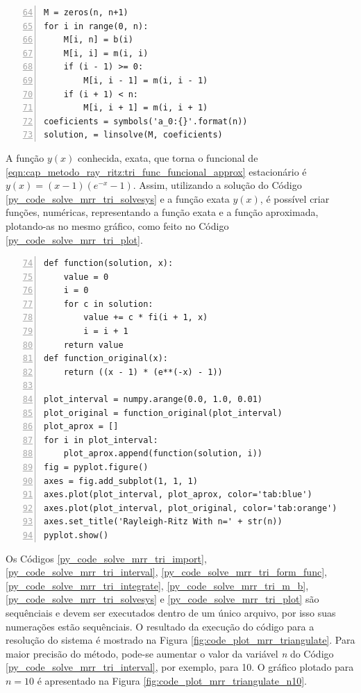 \documentclass[
	12pt,				%
	openright,			%
    twoside,			%
	a4paper,			%
	english,			%
	french,				%
	spanish,			%
	brazil				%
	]{abntex2}
\numberwithin{lema}{chapter}
\numberwithin{teorema}{chapter}
\numberwithin{definicao}{chapter}
\numberwithin{exemplo}{chapter}
\numberwithin{figure}{chapter}
\begin{document}
\begin{lstlisting}[style=Python, xleftmargin=2em, numbers=left, firstnumber=64, caption={Definição e resolução do sistema linear}, captionpos=t, label=py_code_solve_mrr_tri_solvesys]
M = zeros(n, n+1)
for i in range(0, n):
    M[i, n] = b(i)
    M[i, i] = m(i, i)
    if (i - 1) >= 0:
        M[i, i - 1] = m(i, i - 1)
    if (i + 1) < n:
        M[i, i + 1] = m(i, i + 1)
coeficients = symbols('a_0:{}'.format(n))
solution, = linsolve(M, coeficients)
\end{lstlisting}

A função $y(x)$ conhecida, exata, que torna o funcional de \eqref{eqn:cap_metodo_ray_ritz:tri_func_funcional_approx} estacionário é $y(x)=(x-1)(e^{-x}-1)$. Assim, utilizando a solução do Código \ref{py_code_solve_mrr_tri_solvesys} e a função exata $y(x)$, é possível criar funções, numéricas, representando a função exata e a função aproximada, plotando-as no mesmo gráfico, como feito no Código \ref{py_code_solve_mrr_tri_plot}.

\begin{lstlisting}[style=Python, xleftmargin=2em, numbers=left, firstnumber=74, caption={Plotagem das funções exata e aproximada}, captionpos=t, label=py_code_solve_mrr_tri_plot]
def function(solution, x):
    value = 0
    i = 0
    for c in solution:
        value += c * fi(i + 1, x)
        i = i + 1
    return value
def function_original(x):
    return ((x - 1) * (e**(-x) - 1))

plot_interval = numpy.arange(0.0, 1.0, 0.01)
plot_original = function_original(plot_interval)
plot_aprox = []
for i in plot_interval:
    plot_aprox.append(function(solution, i))
fig = pyplot.figure()
axes = fig.add_subplot(1, 1, 1)
axes.plot(plot_interval, plot_aprox, color='tab:blue')
axes.plot(plot_interval, plot_original, color='tab:orange')
axes.set_title('Rayleigh-Ritz With n=' + str(n))
pyplot.show()
\end{lstlisting}

Os Códigos \ref{py_code_solve_mrr_tri_import}, \ref{py_code_solve_mrr_tri_interval}, \ref{py_code_solve_mrr_tri_form_func}, \ref{py_code_solve_mrr_tri_integrate}, \ref{py_code_solve_mrr_tri_m_b}, \ref{py_code_solve_mrr_tri_solvesys} e \ref{py_code_solve_mrr_tri_plot} são sequênciais e devem ser executados dentro de um único arquivo, por isso suas numerações estão sequênciais. O resultado da execução do código para a resolução do sistema é mostrado na Figura \ref{fig:code_plot_mrr_triangulate}. Para maior precisão do método, pode-se aumentar o valor da variável \textit{n} do Código \ref{py_code_solve_mrr_tri_interval}, por exemplo, para 10. O gráfico plotado para $n=10$ é apresentado na Figura \ref{fig:code_plot_mrr_triangulate_n10}.
\end{document}
